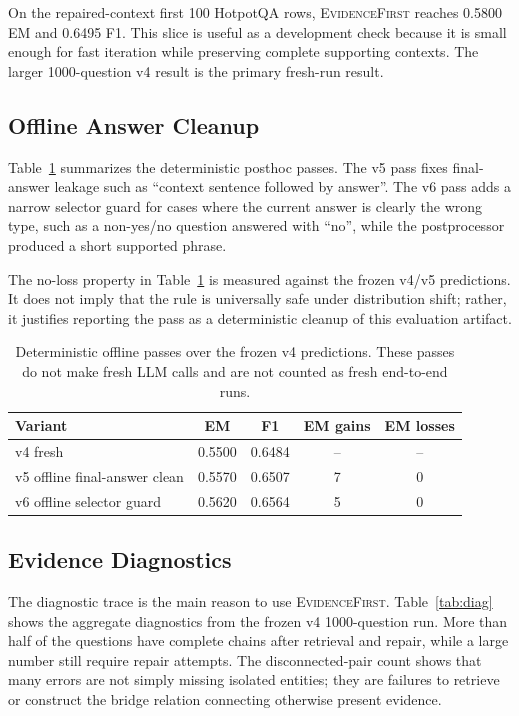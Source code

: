 \documentclass[runningheads]{llncs}
\newcommand{\sys}{\textsc{EvidenceFirst}\xspace}
\begin{document}
On the repaired-context first 100 HotpotQA rows, \sys reaches 0.5800 EM and
0.6495 F1. This slice is useful as a development check because it is small
enough for fast iteration while preserving complete supporting contexts. The
larger 1000-question v4 result is the primary fresh-run result.

\subsection{Offline Answer Cleanup}

Table~\ref{tab:offline_passes} summarizes the deterministic posthoc passes.
The v5 pass fixes final-answer leakage such as ``context sentence followed by
answer''. The v6 pass adds a narrow selector guard for cases where the current
answer is clearly the wrong type, such as a non-yes/no question answered with
``no'', while the postprocessor produced a short supported phrase.

The no-loss property in Table~\ref{tab:offline_passes} is measured against the
frozen v4/v5 predictions. It does not imply that the rule is universally safe
under distribution shift; rather, it justifies reporting the pass as a
deterministic cleanup of this evaluation artifact.

\begin{table}[t]
\centering
\caption{Deterministic offline passes over the frozen v4 predictions. These
passes do not make fresh LLM calls and are not counted as fresh end-to-end
runs.}
\label{tab:offline_passes}
\begin{tabular}{lcccc}
\toprule
Variant & EM & F1 & EM gains & EM losses \\
\midrule
v4 fresh & 0.5500 & 0.6484 & -- & -- \\
v5 offline final-answer clean & 0.5570 & 0.6507 & 7 & 0 \\
v6 offline selector guard & 0.5620 & 0.6564 & 5 & 0 \\
\bottomrule
\end{tabular}
\end{table}

\subsection{Evidence Diagnostics}

The diagnostic trace is the main reason to use \sys. Table~\ref{tab:diag}
shows the aggregate diagnostics from the frozen v4 1000-question run. More
than half of the questions have complete chains after retrieval and repair,
while a large number still require repair attempts. The disconnected-pair
count shows that many errors are not simply missing isolated entities; they
are failures to retrieve or construct the bridge relation connecting otherwise
present evidence.
\end{document}
